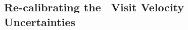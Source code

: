 \documentclass[modern]{aastex63}
\begin{document}



\subsection{Re-calibrating the \apogee\ Visit Velocity Uncertainties}
\label{sec:visitcalib}
\end{document}

